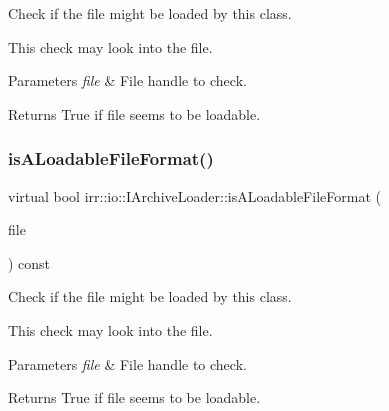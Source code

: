 Check if the file might be loaded by this class. 

This check may look into the file. 
\begin{DoxyParams}{Parameters}
{\em file} & File handle to check. \\
\hline
\end{DoxyParams}
\begin{DoxyReturn}{Returns}
True if file seems to be loadable. 
\end{DoxyReturn}
\mbox{\label{classirr_1_1io_1_1IArchiveLoader_acda22c3c2a5268665a4a4cf17379931b}} 
\subsubsection{\texorpdfstring{is\+A\+Loadable\+File\+Format()}{isALoadableFileFormat()}\hspace{0.1cm}{\footnotesize\ttfamily [4/6]}}
{\footnotesize\ttfamily virtual bool irr\+::io\+::\+I\+Archive\+Loader\+::is\+A\+Loadable\+File\+Format (\begin{DoxyParamCaption}\item[{\hyperlink{classirr_1_1io_1_1IReadFile}{io\+::\+I\+Read\+File} $\ast$}]{file }\end{DoxyParamCaption}) const\hspace{0.3cm}{\ttfamily [pure virtual]}}



Check if the file might be loaded by this class. 

This check may look into the file. 
\begin{DoxyParams}{Parameters}
{\em file} & File handle to check. \\
\hline
\end{DoxyParams}
\begin{DoxyReturn}{Returns}
True if file seems to be loadable. 
\end{DoxyReturn}
\mbox{\label{classirr_1_1io_1_1IArchiveLoader_af60c081f27ab941702a4a32dfe482c05}} 

